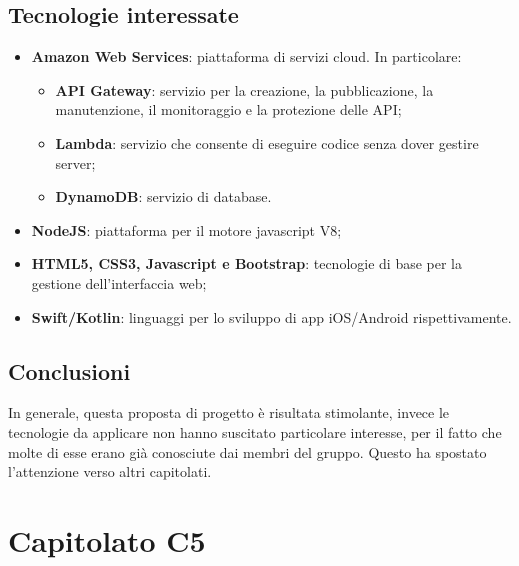\documentclass[11pt,a4paper]{article}
\begin{document}
\subsection{Tecnologie interessate}
\begin{itemize}
\item \textbf{Amazon Web Services}: piattaforma di servizi cloud. In particolare:
	\begin{itemize}
	\item \textbf{API Gateway}: servizio per la creazione, la pubblicazione, la manutenzione, il monitoraggio e la protezione delle API;
	\item \textbf{Lambda}: servizio che consente di eseguire codice senza dover gestire server;
	\item  \textbf{DynamoDB}: servizio di database.
	\end{itemize}
\item \textbf{NodeJS}: piattaforma per il motore javascript V8;
\item \textbf{HTML5, CSS3, Javascript e Bootstrap}: tecnologie di base per la gestione dell'interfaccia web;
\item \textbf{Swift/Kotlin}: linguaggi per lo sviluppo di app iOS/Android rispettivamente.
\end{itemize}
\subsection{Conclusioni}
In generale, questa proposta di progetto è risultata stimolante, invece le tecnologie da applicare non hanno suscitato particolare interesse, per il fatto che molte di esse erano già conosciute dai membri del gruppo. Questo ha spostato l'attenzione verso altri capitolati.
\newpage
\section{Capitolato C5}
\end{document}
